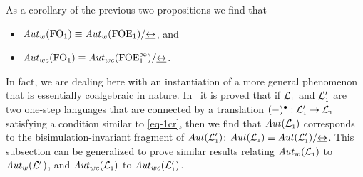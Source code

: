 
\begin{remark}{\rm
As a corollary of the previous two propositions we find that 
\begin{itemize}
	 pt
	\item $\AutW(\ofo) \equiv \AutW(\ofoe)/{\bis}$, and
	\item $\AutWC(\ofo) \equiv \AutWC(\olque)/{\bis}$.
\end{itemize}
In fact, we are dealing here with an instantiation of a more general phenomenon 
that is essentially coalgebraic in nature.
In~\cite{Venxx} it is proved that if $\llang$ and $\llang'$ are two one-step
languages that are connected by a translation $(-)^{\bullet}: \llang' \to 
\llang$ satisfying a condition similar to \eqref{eq-1cr}, then we find that 
$\Aut(\llang)$ corresponds to the bisimulation-invariant fragment of 
$\Aut(\llang')$: $\Aut(\llang) \equiv \Aut(\llang')/{\bis}$.
This subsection can be generalized to prove similar results relating
$\AutW(\llang)$ to $\AutW(\llang')$, and $\AutWC(\llang)$ to 
$\AutWC(\llang')$.
}\end{remark}
